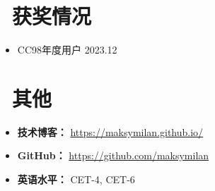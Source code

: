 \documentclass[11pt]{article}
\begin{document}
\section{\makebox[\widthof{\faGraduationCap}][c]{\color{CVBlue}\faList}\ 获奖情况}
\begin{itemize}
	\item CC98年度用户 \hfill 2023.12
	
\end{itemize}
    
\section{\makebox[\widthof{\faInfo}][c]{\color{CVBlue}\faInfo}\ 其他}
\begin{itemize}[parsep=0.5ex]
    \item \textbf{技术博客：} \href{https://maksymilan.github.io/}{https://maksymilan.github.io/}
    \item \textbf{GitHub：} \href{https://github.com/maksymilan}{https://github.com/maksymilan} 
    \item \textbf{英语水平：} CET-4, CET-6
\end{itemize}
\end{document}
